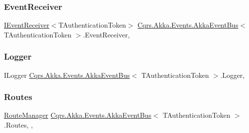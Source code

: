 \subsubsection{\texorpdfstring{Event\+Receiver}{EventReceiver}}
{\footnotesize\ttfamily \hyperlink{interfaceCqrs_1_1Events_1_1IEventReceiver}{I\+Event\+Receiver}$<$T\+Authentication\+Token$>$ \hyperlink{classCqrs_1_1Akka_1_1Events_1_1AkkaEventBus}{Cqrs.\+Akka.\+Events.\+Akka\+Event\+Bus}$<$ T\+Authentication\+Token $>$.Event\+Receiver\hspace{0.3cm}{\ttfamily [get]}, {\ttfamily [protected]}}

\mbox{\label{classCqrs_1_1Akka_1_1Events_1_1AkkaEventBus_a0bbdde7f2011707581db6a66cd73c5c4}} 
\subsubsection{\texorpdfstring{Logger}{Logger}}
{\footnotesize\ttfamily I\+Logger \hyperlink{classCqrs_1_1Akka_1_1Events_1_1AkkaEventBus}{Cqrs.\+Akka.\+Events.\+Akka\+Event\+Bus}$<$ T\+Authentication\+Token $>$.Logger\hspace{0.3cm}{\ttfamily [get]}, {\ttfamily [protected]}}

\mbox{\label{classCqrs_1_1Akka_1_1Events_1_1AkkaEventBus_a22f195a654564335ffa5f6df01b8af8d}} 
\subsubsection{\texorpdfstring{Routes}{Routes}}
{\footnotesize\ttfamily \hyperlink{classCqrs_1_1Bus_1_1RouteManager}{Route\+Manager} \hyperlink{classCqrs_1_1Akka_1_1Events_1_1AkkaEventBus}{Cqrs.\+Akka.\+Events.\+Akka\+Event\+Bus}$<$ T\+Authentication\+Token $>$.Routes\hspace{0.3cm}{\ttfamily [static]}, {\ttfamily [get]}, {\ttfamily [protected]}}

